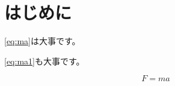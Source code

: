 \documentclass[../../../main]{subfiles}
\begin{document}
\section{はじめに}

\ref{eq:ma}は大事です。

\ref{eq:ma1}も大事です。

\begin{equation}\label{eq:ma1}
	F = ma
\end{equation}
\end{document}
